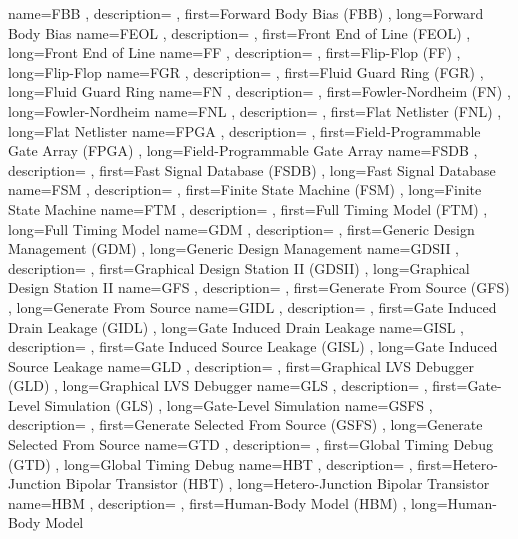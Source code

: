 { name={FBB}
, description={}
, first={Forward Body Bias (FBB)}
, long={Forward Body Bias}
}
{ name={FEOL}
, description={}
, first={Front End of Line (FEOL)}
, long={Front End of Line}
}
{ name={FF}
, description={}
, first={Flip-Flop (FF)}
, long={Flip-Flop}
}
{ name={FGR}
, description={}
, first={Fluid Guard Ring (FGR)}
, long={Fluid Guard Ring}
}
{ name={FN}
, description={}
, first={Fowler-Nordheim (FN)}
, long={Fowler-Nordheim}
}
{ name={FNL}
, description={}
, first={Flat Netlister (FNL)}
, long={Flat Netlister}
}
{ name={FPGA}
, description={}
, first={Field-Programmable Gate Array (FPGA)}
, long={Field-Programmable Gate Array}
}
{ name={FSDB}
, description={}
, first={Fast Signal Database (FSDB)}
, long={Fast Signal Database}
}
{ name={FSM}
, description={}
, first={Finite State Machine (FSM)}
, long={Finite State Machine}
}
{ name={FTM}
, description={}
, first={Full Timing Model (FTM)}
, long={Full Timing Model}
}
{ name={GDM}
, description={}
, first={Generic Design Management (GDM)}
, long={Generic Design Management}
}
{ name={GDSII}
, description={}
, first={Graphical Design Station II (GDSII)}
, long={Graphical Design Station II}
}
{ name={GFS}
, description={}
, first={Generate From Source (GFS)}
, long={Generate From Source}
}
{ name={GIDL}
, description={}
, first={Gate Induced Drain Leakage (GIDL)}
, long={Gate Induced Drain Leakage}
}
{ name={GISL}
, description={}
, first={Gate Induced Source Leakage (GISL)}
, long={Gate Induced Source Leakage}
}
{ name={GLD}
, description={}
, first={Graphical LVS Debugger (GLD)}
, long={Graphical LVS Debugger}
}
{ name={GLS}
, description={}
, first={Gate-Level Simulation (GLS)}
, long={Gate-Level Simulation}
}
{ name={GSFS}
, description={}
, first={Generate Selected From Source (GSFS)}
, long={Generate Selected From Source}
}
{ name={GTD}
, description={}
, first={Global Timing Debug (GTD)}
, long={Global Timing Debug}
}
{ name={HBT}
, description={}
, first={Hetero-Junction Bipolar Transistor (HBT)}
, long={Hetero-Junction Bipolar Transistor}
}
{ name={HBM}
, description={}
, first={Human-Body Model (HBM)}
, long={Human-Body Model}
}
